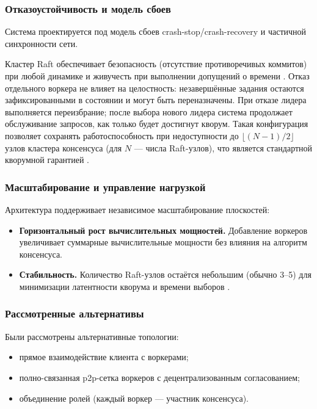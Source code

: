 \subsubsection{Отказоустойчивость и модель сбоев}

Система проектируется под модель сбоев crash-stop/crash-recovery и частичной
синхронности сети.

Кластер Raft обеспечивает безопасность (отсутствие противоречивых коммитов) при
любой динамике и живучесть при выполнении допущений о времени
\cite{ongario2014}. Отказ отдельного воркера не влияет на целостность:
незавершённые задания остаются зафиксированными в состоянии и могут быть
переназначены. При отказе лидера выполняется переизбрание; после выбора нового
лидера система продолжает обслуживание запросов, как только будет достигнут
кворум. Такая конфигурация позволяет сохранять работоспособность при
недоступности до $\lfloor (N-1)/2 \rfloor$ узлов кластера консенсуса (для $N$ —
числа Raft-узлов), что является стандартной кворумной гарантией
\cite{lynch1996}.


\subsubsection{Масштабирование и управление нагрузкой}

Архитектура поддерживает независимое масштабирование плоскостей:
\begin{itemize}
  \item \textbf{Горизонтальный рост вычислительных мощностей.} Добавление воркеров
  увеличивает суммарные вычислительные мощности без влияния на алгоритм
  консенсуса.
  \item \textbf{Стабильность.} Количество Raft-узлов остаётся небольшим (обычно
  3–5) для минимизации латентности кворума и времени выборов
  \cite{ongario2014}.
\end{itemize}

\subsubsection{Рассмотренные альтернативы}

Были рассмотрены альтернативные топологии:

\begin{itemize}
\item прямое взаимодействие клиента с воркерами;
\item полно-связанная p2p-сетка воркеров с децентрализованным согласованием;
\item объединение ролей (каждый воркер — участник консенсуса).
\end{itemize}

